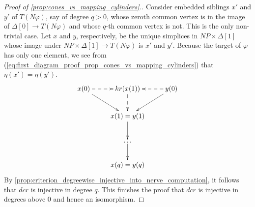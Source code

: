 \begin{proof}[Proof of \cref{prop:cones_vs_mapping_cylinders}.]
Consider embedded siblings $x'$ and $y'$ of $T(N\varphi )$, say of degree $q>0$, whose zeroth common vertex is in the image of $\Delta [0]\to T(N\varphi )$ and whose $q$-th common vertex is not. This is the only non-trivial case. Let $x$ and $y$, respectively, be the unique simplices in $NP\times \Delta [1]$ whose image under $NP\times \Delta [1]\to T(N\varphi )$ is $x'$ and $y'$. Because the target of $\varphi$ has only one element, we see from (\ref{eq:first_diagram_proof_prop_cones_vs_mapping_cylinders}) that $\eta (x')=\eta (y')$.
\begin{equation}
\label{eq:first_diagram_proof_prop_cones_vs_mapping_cylinders}
\begin{gathered}
\xymatrix{
x(0) \ar[dr] \ar@{-->}[r] & kr(x(1)) \ar@{-->}[d] & y(0) \ar[ld] \ar@{-->}[l] \\
& x(1)=y(1) \ar[d] \\
& \dots \ar[d] \\
& x(q)=y(q)
}
\end{gathered}
\end{equation}
By \cref{prop:criterion_degreewise_injective_into_nerve_computation}, it follows that $dcr$ is injective in degree $q$. This finishes the proof that $dcr$ is injective in degrees above $0$ and hence an isomorphism.
\end{proof}


